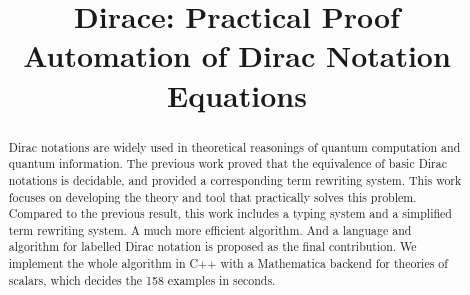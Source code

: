 \documentclass[runningheads]{llncs}
\begin{document}
%
\title{Dirace: Practical Proof Automation of Dirac Notation Equations}




%
\maketitle              %
%
\begin{abstract}

Dirac notations are widely used in theoretical reasonings of quantum computation and quantum information.
The previous work proved that the equivalence of basic Dirac notations is decidable, and provided a
corresponding term rewriting system.
This work focuses on developing the theory and tool that practically solves this problem. Compared to the
previous result, this work includes a typing system and a simplified term rewriting system.
A much more efficient algorithm.
And a language and algorithm for labelled Dirac notation is proposed as the final contribution.
We implement the whole algorithm in C++ with a Mathematica backend for theories of scalars, which 
decides the 158 examples in seconds.


\end{abstract}
%
%
%



\newcommand*{\sem}[1]{{\llbracket #1 \rrbracket}}
\newcommand{\DiracDec}{\textsf{DiracDec}}
\end{document}

